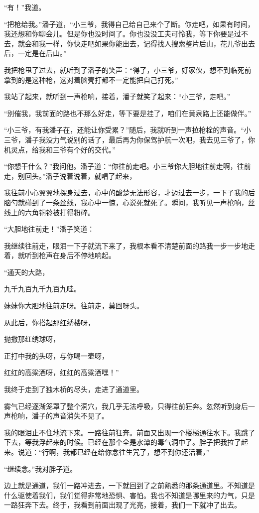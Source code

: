 “有！”我道。

“把枪给我。”潘子道，“小三爷，我得自己给自己来个了断。你走吧，如果有时间，我还想和你聊会儿。但是你也没时间了。你也没没工夫可怜我，等下你要是过不去，就会和我一样，你快走吧如果你能出去，记得找人搜索整片后山，花儿爷出去后，一定是在后山。”

我把枪甩了过去，就听到了潘子的笑声：“得了，小三爷，好家伙，想不到临死前拿到的是这种枪，这对着脑壳打都不一定能把自己打死。”

我站了起来，就听到一声枪响，接着，潘子就笑了起来：“小三爷，走吧。”

“别催我，我前面的路也不那么好走，等下要是挂了，咱们在黄泉路上还能做伴。”

“小三爷，有我潘子在，还能让你受累？”随后，我就听到一声拉枪栓的声音。“小三爷，潘子我没力气说别的话了，最后再为你保驾护航一次吧，我去见三爷了，你机灵点，给我和三爷有个好的交代。”

“你想干什么？”我问他。潘子道：“你往前走吧。小三爷你大胆地往前走啊，往前走，别回头。”潘子说着说着，就唱了起来，

我往前小心翼翼地探身过去，心中的酸楚无法形容，才迈过去一步，一下子我的后脑勺就碰到了一条丝线，我心中一惊，心说死就死了。瞬间，我听见一声枪响，丝线上的六角铜铃被打得粉碎。

“大胆地往前走！”潘子笑道：

我继续往前走，眼泪一下子就流下来了，我根本看不清楚前面的路我一步一步地走着，就听到枪声在身后不停地响起。

“通天的大路，

九千九百九千九百九哇。

妹妹你大胆地往前走呀。往前走，莫回呀头。

从此后，你搭起那红绣楼呀，

抛撒那红绣球呀，

正打中我的头呀，与你喝一壶呀，

红红的高粱酒呀，红红的高粱酒嘿！”

我终于走到了独木桥的尽头，走进了通道里。

雾气已经逐渐笼罩了整个洞穴，我几乎无法呼吸，只得往前狂奔。忽然听到身后一声枪响，潘子的声音消失不见了。

我的眼泪止不住地流下来。一路往前狂奔。前面又出现一个楼梯通往水下。我跳了下去，等我浮起来的时候。已经在那个全是水潭的毒气洞中了。胖子把我拉了起来。说道：“行啊，我都已经在给你念往生咒了，想不到你还活着，”

“继续念。”我对胖子道。

边上就是通道，我们一路冲进去，一下就回到了之前熟悉的那条通道里。不知道是什么驱使着我们，我们觉得非常地恐惧、害怕。我也不知道是哪里来的力气，只是一路狂奔下去。终于，我看到前面出现了光亮，接着，我们一下就冲了出去。

